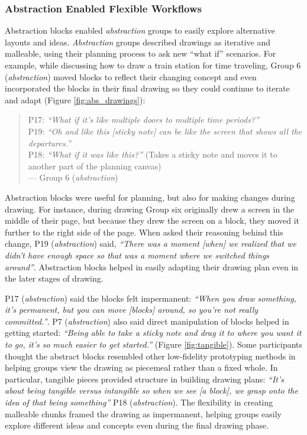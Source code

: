 \subsubsection{Abstraction Enabled Flexible Workflows}
Abstraction blocks enabled \textit{abstraction} groups to easily explore alternative layouts and ideas.
\textit{Abstraction} groups described drawings as iterative and malleable, using their planning process to ask new ``what if'' scenarios. For example, while discussing how to draw a train station for time traveling, Group 6 (\textit{abstraction}) moved blocks to reflect their changing concept and even incorporated the blocks in their final drawing so they could continue to iterate and adapt (Figure \ref{fig:abs_drawings}):

\begin{quote}
    P17: \textit{``What if it's like multiple doors to multiple time periods?''}\\
    P19: \textit{``Oh and like this [sticky note] can be like the screen that shows all the departures.''}\\
    P18: \textit{``What if it was like this?''} (Takes a sticky note and moves it to another part of the planning canvas)\\
    --- Group 6 (\textit{abstraction})
    
\end{quote} 

Abstraction blocks were useful for planning, but also for making changes during drawing. For instance, during drawing Group six originally drew a screen in the middle of their page, but because they drew the screen on a block, they moved it further to the right side of the page. When asked their reasoning behind this change, P19 (\textit{abstraction}) said, \textit{``There was a moment [when] we realized that we didn't have enough space so that was a moment where we switched things around''}. Abstraction blocks helped in easily adapting their drawing plan even in the later stages of drawing. 

P17 (\textit{abstraction}) said the blocks felt impermanent: \textit{``When you draw something, it's permanent, but you can move [blocks] around, so you're not really committed.''}. P7 (\textit{abstraction}) also said direct manipulation of blocks helped in getting started: \textit{``Being able to take a sticky note and drag it to where you want it to go, it's so much easier to get started.''} (Figure \ref{fig:tangible}). Some participants thought the abstract blocks resembled other low-fidelity prototyping methods in helping groups view the drawing as piecemeal rather than a fixed whole. In particular, tangible pieces provided structure in building drawing plans: \textit{``It's about being tangible versus intangible so when we see [a block], we grasp onto the idea of that being something''} P18 (\textit{abstraction}). The flexibility in creating malleable chunks framed the drawing as impermanent, helping groups easily explore different ideas and concepts even during the final drawing phase. 

